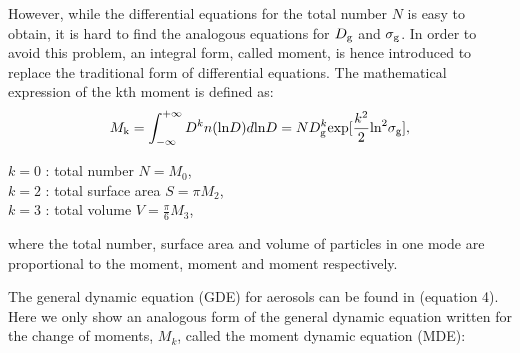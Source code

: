 \documentclass[12pt, fullpage]{uiucthesis2009_2}
\begin{document}
		However, while the differential equations for the total number $N$ is easy to obtain, it is hard to find the analogous equations for $D_{\rm g}$ and $\sigma_{\rm g}$. In order to avoid this problem, an integral form, called moment, is hence introduced to replace the traditional form of differential equations. The mathematical expression of the kth moment is defined as:
		\begin{align}
		M_\text{k} = \int_{-\infty}^{+\infty}D^kn(\text{ln}D)d\text{ln}D = ND_{\rm g}^k\text{exp}[\frac{k^2}{2}\text{ln}^2\sigma_{\rm g}],
		\end{align}
		\begin{flushleft}
			$k = 0$ : total number $N = M_0$, \\
			$k = 2$ : total surface area $S = \pi M_2$, \\
			$k = 3$ : total volume $V = \frac{\pi}{6}M_3$, \\
		\end{flushleft}
		where the total number, surface area and volume of particles in one mode are proportional to the  moment,  moment and  moment respectively. 
		
		The general dynamic equation (GDE) for aerosols can be found in \citet{whitby1997} (equation 4). Here we only show an analogous form of the general dynamic equation written for the change of moments, $M_{k}$, called the moment dynamic equation (MDE):
		
\end{document}
